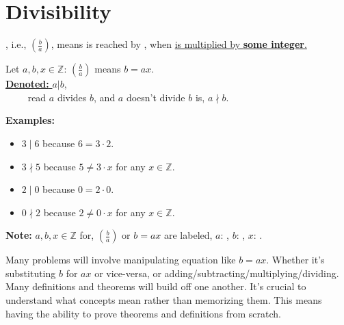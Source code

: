 

\section{Divisibility}

, i.e., $\left(\frac{b}{a}\right)$, means  is reached by , when \underline{ is multiplied by \textbf{some integer}.}

\begin{Def}[Division]

    \label{def:division}

    Let $a,b,x\in\mathbb{Z}$: $\left(\frac{b}{a}\right)$ means $b=ax$.\\

    \noindent
    \underline{\textbf{Denoted:} $a|b$,}\\
    $\qquad$ read $a$ divides $b$, and $a$ doesn't divide $b$ is, $a\nmid b$.\\
    \noindent
\end{Def}

\noindent
\textbf{Examples:}
\begin{itemize}
    \item $3\mid 6$ because $6=3\cdot2$.
    \item $3\nmid5$ because $5\neq3\cdot x$ for any $x\in\mathbb{Z}$.
    \item $2\mid 0$ because $0=2\cdot0$.
    \item $0\nmid2$ because $2\neq0\cdot x$ for any $x\in\mathbb{Z}$.
\end{itemize}


\begin{Note}
    \textbf{Note:} $a,b,x\in\mathbb{Z}$ for, $\left(\frac{b}{a}\right)$ or $b = ax$ are labeled, $a$: , $b$: , $x$: .
\end{Note}

\begin{Tip}
    Many problems will involve manipulating equation like $b=ax$. Whether
    it's substituting $b$ for $ax$ or vice-versa, or adding/subtracting/multiplying/dividing.\\

    \noindent
    Many definitions and theorems will build off one another.
    It's crucial to understand what concepts mean rather than memorizing them. This means
    having the ability to prove theorems and definitions from scratch.
\end{Tip}

